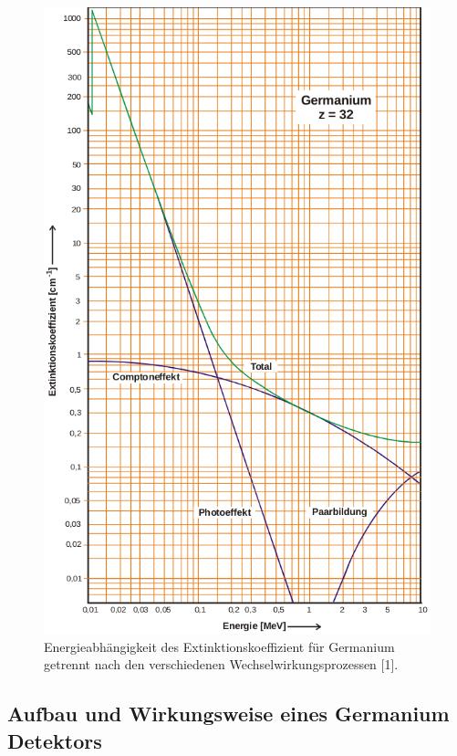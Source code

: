 \begin{figure}
    \centering
    \includegraphics[scale=0.3]{content/Ext.png}
    \caption{Energieabhängigkeit des Extinktionskoeffizient für Germanium getrennt nach den verschiedenen Wechselwirkungsprozessen [1].}
    \label{fig:Ext}
\end{figure}

\subsection{Aufbau und Wirkungsweise eines Germanium Detektors}

